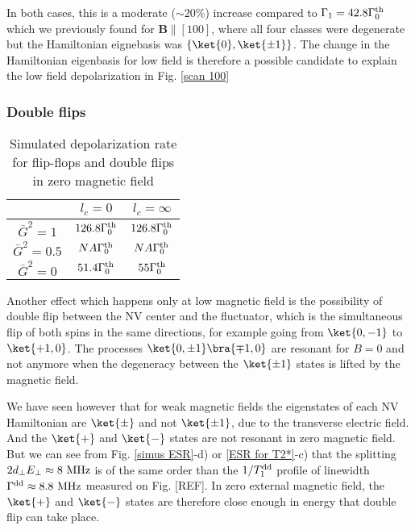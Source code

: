 \documentclass[a4paper,11pt]{report}
\begin{document}
In both cases, this is a moderate ($\sim 20 \%$) increase compared to $\Gamma_1=42.8 \Gamma_0^{\rm th}$ which we previously found for $\mathbf{B} \parallel [100]$, where all four classes were degenerate but the Hamiltonian eignebasis was $\{ \ket{0}, \ket{\pm 1} \}$. The change in the Hamiltonian eigenbasis for low field is therefore a possible candidate to explain the low field depolarization in Fig. \ref{scan 100}

\subsubsection{Double flips}

\begin{table}[htbp]
\centering
\caption{Simulated depolarization rate for flip-flops and double flips in zero magnetic field}
 \label{table double flips}
\begin{tabular}{c|cc}
{} & $l_c=0$ & $l_c=\infty$ \\
\midrule
$\bar{G}^2=1$ & $126.8 \Gamma_0^{\rm th}$ & $126.8 \Gamma_0^{\rm th}$ \\
$\bar{G}^2=0.5$ & $NA \Gamma_0^{\rm th}$ & $NA \Gamma_0^{\rm th}$ \\
$\bar{G}^2=0$ & $51.4 \Gamma_0^{\rm th}$ & $55 \Gamma_0^{\rm th}$ \\
\end{tabular}
\end{table}

Another effect which happens only at low magnetic field is the possibility of double flip between the NV center and the fluctuator, which is the simultaneous flip of both spins in the same directions, for example going from $\ket{0,-1}$ to $\ket{+1,0}$. The processes $\ket{0, \pm 1}\bra{\mp 1,0}$ are resonant for $B=0$ and not anymore when the degeneracy between the $\ket{\pm 1}$ states is lifted by the magnetic field.

We have seen however that for weak magnetic fields the eigenstates of each NV Hamiltonian are $\ket{\pm}$ and not $\ket{\pm 1}$, due to the transverse electric field. And the $\ket{+}$ and $\ket{-}$ states are not resonant in zero magnetic field. But we can see from Fig. \ref{simus ESR}-d) or \ref{ESR for T2*}-c) that the splitting $2 d_\perp E_\perp \approx 8\ \rm MHz$ is of the same order than the $1/T_1^{\rm dd}$ profile of linewidth $\Gamma^{\rm dd} \approx 8.8\ \rm MHz$ measured on Fig. [REF]. In zero external magnetic field, the $\ket{+}$ and $\ket{-}$ states are therefore close enough in energy that double flip can take place.
\end{document}
